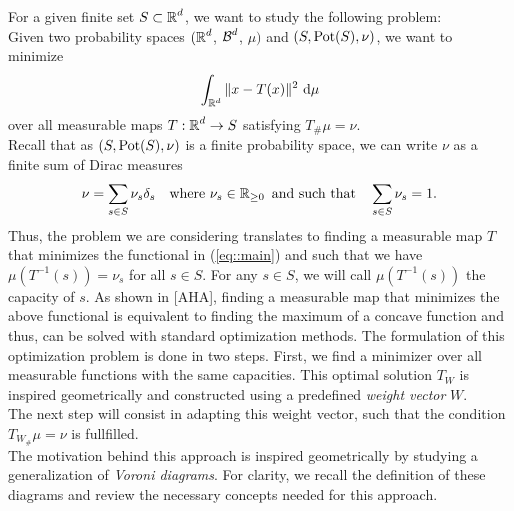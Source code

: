 \documentclass[
     12pt,         %
     a4paper,      %
     BCOR=10mm,     %
     DIV=14,        %
     ]{scrreprt}
\begin{document}
     
    

    
    For a given finite set $S \subset \operatorname{\mathbb{R}}^d$, we want to study the following problem: \\ 
    Given two probability spaces $(\operatorname{\mathbb{R}}^d$, $\operatorname{\mathcal{B}}^d$, $\mu)$ and $(S, \operatorname{Pot}(S), \nu)$, we want to minimize 
    \begin{align} \label{eq::main}
        \int_{\operatorname{\mathbb{R}}^d} \|x-T(x) \|^2 \ {\operatorname{{\mathrm{d}}}} \mu  
    \end{align}
    over all measurable maps $T: \operatorname{\mathbb{R}}^d \to S$ satisfying $T_{\#}\mu = \nu$. \\%
    Recall that as $(S, \operatorname{Pot}(S), \nu)$ is a finite probability space, we can write $\nu$ as a finite sum of Dirac measures
    \begin{align} \label{eq::dirac} 
        \nu = \sum_{s\in S} {\nu_s \delta_{s}} \quad \text{where   } \nu_s \in \operatorname{\mathbb{R}}_{\ge 0} \text{   and such that} \quad \sum_{s \in S}{\nu_s} = 1. 
    \end{align}
    Thus, the problem we are considering translates to finding a measurable map $T$ that minimizes the functional in (\ref{eq::main}) and such that we have 
    $\mu (T^{-1}(s)) = \nu_s$ for all $s\in S$. For any $s\in S$, we will call $\mu(T^{-1}(s)) $ the capacity of $s$.
    \indent As shown in [AHA], finding a measurable map that minimizes the above functional is equivalent to finding the maximum of a concave function and thus, can be solved with
    standard optimization methods. The formulation of this optimization problem is done in two steps.
    First, we find a minimizer over all measurable functions with the same capacities.  This optimal solution $T_W$ is inspired geometrically and constructed using 
    a predefined \textit{weight vector}  $W$.\\
    The next step will consist in adapting this weight vector, such that the condition $T_{W_{\#}}\mu = \nu$ is fullfilled.\\ 
    The motivation behind this approach is inspired geometrically by studying a generalization of \textit{Voroni diagrams}. 
    For clarity, we recall the definition of these diagrams and review the necessary concepts needed for this approach. 
\end{document}
